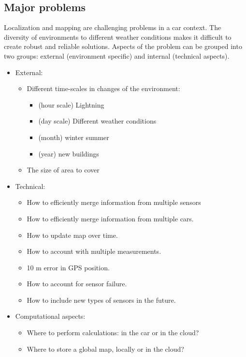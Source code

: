 \subsection{Major problems}

Localization and mapping are challenging problems in a car context. The diversity of environments to different weather conditions makes it difficult to create robust and reliable solutions. Aspects of the problem can
be grouped into two groups: external (environment specific) and
internal (technical aspects).
\begin{itemize}
\item External:
  \begin{itemize}
  \item Different time-scales in changes of the environment:
    \begin{itemize}
    \item (hour scale) Lightning
    \item (day scale) Different weather conditions
    \item (month) winter summer
    \item (year) new buildings
    \end{itemize}
  \item The size of area to cover
  \end{itemize}
\item Technical:
  \begin{itemize}
  \item  How to efficiently merge information from multiple
    sensors
  \item  How to efficiently merge information from multiple cars.
  \item  How to update map over time.
  \item How to account with multiple measurements.
  \item  10 m error in GPS position.
  \item  How to account for sensor failure.
  \item  How to include new types of sensors in the future.
  \end{itemize}
\item  Computational aspects:
  \begin{itemize}
  \item   Where to perform calculations: in the car or in the
    cloud?
  \item   Where to store a global map, locally or in the cloud?
 \end{itemize}
\end{itemize}


